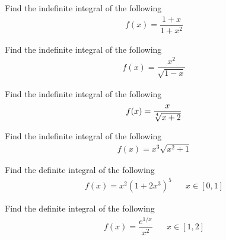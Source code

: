 \begin{exercise}
Find the indefinite integral of the following 
\begin{align*}
    f(x) = \dfrac{1+x}{1 + x^{2}}
\end{align*}
\end{exercise}

\begin{exercise}
Find the indefinite integral of the following 
\begin{align*}
    f(x) = \dfrac{x^{2}}{\sqrt{1 - x}}
\end{align*}
\end{exercise}

\begin{exercise}
Find the indefinite integral of the following 
\begin{align*}
    f(x) = \dfrac{x}{\sqrt[\leftroot{2}\uproot{2}4]{x + 2}}
\end{align*}
\end{exercise}

\begin{exercise}
Find the indefinite integral of the following 
\begin{align*}
    f(x) = x^{3} \sqrt{x^{2} + 1}
\end{align*}
\end{exercise}

\begin{exercise}
Find the definite integral of the following 
\begin{align*}
    f(x) = x^{2} (1 + 2x^{3})^{5} \hspace{20pt} x \in [0, 1]
\end{align*}
\end{exercise}

\begin{exercise}
Find the definite integral of the following 
\begin{align*}
    f(x) = \dfrac{e^{1/x}}{x^{2}} \hspace{20pt} x \in [1, 2]
\end{align*}
\end{exercise}

